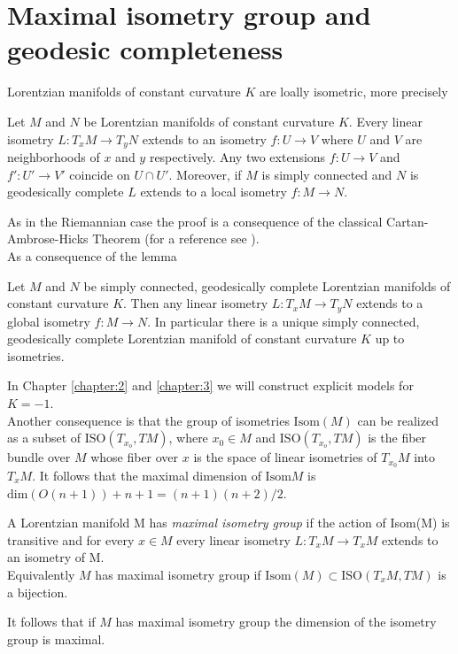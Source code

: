 \section{Maximal isometry group and geodesic completeness}
Lorentzian manifolds of constant curvature $K$ are loally isometric, more precisely
\begin{lemma}
    Let $M$ and $N$ be Lorentzian manifolds of constant curvature $K$. Every linear isometry $L: T_x M \to T_y N$ extends to an isometry $f: U \to V$ where $U$ and $V$ are neighborhoods of $x$ and $y$ respectively. Any two extensions $f:U\to V$ and $f' : U' \to V'$ coincide on $U \cap U'$. Moreover, if $M$ is simply connected and $N$ is geodesically complete $L$ extends to a local isometry $f:M\to N$.
\end{lemma}
As in the Riemannian case the proof is a consequence of the classical Cartan-Ambrose-Hicks Theorem (for a reference see \cite{piccione2005single}).\\
As a consequence of the lemma
\begin{corollary}
    Let $M$ and $N$ be simply connected, geodesically complete Lorentzian manifolds of constant curvature $K$. Then any linear isometry $L: T_x M \to T_y N$ extends to a global isometry $f: M \to N$. In particular there is a unique simply connected, geodesically complete Lorentzian manifold of constant curvature $K$ up to isometries.
\end{corollary}
\noindent In Chapter \ref{chapter:2} and \ref{chapter:3} we will construct explicit models for $K=-1$.\\
Another consequence is that the group of isometries $\text{Isom}(M)$ can be realized as a subset of $\text{ISO}(T_{x_o}, TM)$, where $x_0 \in M$ and $\text{ISO}(T_{x_o}, TM)$ is the fiber bundle over $M$ whose fiber over $x$ is the space of linear isometries of $T_{x_0}M$ into $T_xM$.
It follows that the maximal dimension of $\text{Isom}M$ is $\text{dim}(O(n+1)) + n +1 = (n+1)(n+2)/2$.\\
\begin{definition}
    A Lorentzian manifold M has \textit{maximal isometry group} if the action of Isom(M) is transitive and for every $x\in M$ every linear isometry $L: T_xM \to T_xM$ extends to an isometry of M.\\
    Equivalently $M$ has maximal isometry group if $\text{Isom}(M) \subset \text{ISO}(T_xM, TM)$ is a bijection.
\end{definition}
It follows that if $M$ has maximal isometry group the dimension of the isometry group is maximal.\\
